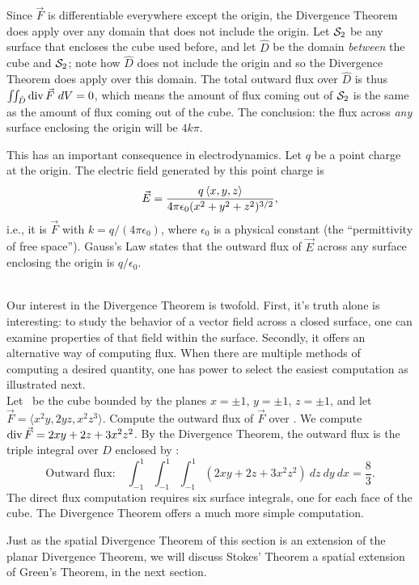 {Since $\vec F$ is differentiable everywhere except the origin, the Divergence Theorem does apply over any domain that does not include the origin. Let $\mathcal{S}_2$ be any surface that encloses the cube used before, and let $\hat D$ be the domain \emph{between} the cube and $\mathcal{S}_2$; note how $\hat D$ does not include the origin and so the Divergence Theorem does apply over this domain. The total outward flux over $\hat D$ is thus $\iint_{\hat D}\operatorname{div} \vec F\ dV = 0$, which means the amount of flux coming out of $\mathcal{S}_2$ is the same as the amount of flux coming out of the cube. The conclusion: the flux across \emph{any} surface enclosing the origin will be $4k\pi$. 

This has an important consequence in electrodynamics. Let $q$ be a point charge at the origin. The electric field generated by this point charge is 
$$\vec E = \frac{q \left\langle x,y,z\right\rangle}{4\pi \epsilon_0(x^2+y^2+z^2)^{3/2}},$$
i.e., it is $\vec F$ with $k = q/(4\pi \epsilon_0)$, where $\epsilon_0$ is a physical constant (the ``permittivity of free space''). Gauss's Law states that the outward flux of $\vec E$ across any surface enclosing the origin is $q/\epsilon_0$.
}\\

Our interest in the Divergence Theorem is twofold. First, it's truth alone is interesting: to study the behavior of a vector field across a closed surface, one can examine properties of that field within the surface. Secondly, it offers an alternative way of computing flux. When there are multiple methods of computing a desired quantity, one has power to select the easiest computation as illustrated next.\\

{Let \surfaceS\ be the cube bounded by the planes $x=\pm 1$, $y=\pm 1$, $z=\pm 1$, and let $\vec F = \langle x^2y,2yz,x^2z^3\rangle$. Compute the outward flux of $\vec F$ over \surfaceS.
}
{We compute $\operatorname{div} \vec F = 2xy+2z+3x^2z^2$. By the Divergence Theorem, the outward flux is the triple integral over $D$ enclosed by \surfaceS:
$$\text{Outward flux:}\quad \int_{-1}^1\int_{-1}^1\int_{-1}^1(2xy+2z+3x^2z^2)\ dz\ dy\ dx = \frac83.$$
The direct flux computation requires six surface integrals, one for each face of the cube. The Divergence Theorem offers a much more simple computation.
}

Just as the spatial Divergence Theorem of this section is an extension of the planar Divergence Theorem, we will discuss Stokes' Theorem a spatial extension of Green's Theorem, in the next section.

